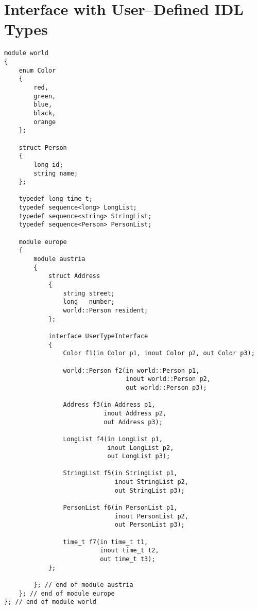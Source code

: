 \section{Interface with User--Defined IDL Types}

\begin{small}
\begin{verbatim}
module world 
{
    enum Color 
    {
        red, 
        green, 
        blue, 
        black, 
        orange
    };
  
    struct Person 
    {
        long id;
        string name;
    };
  
    typedef long time_t;
    typedef sequence<long> LongList;
    typedef sequence<string> StringList;
    typedef sequence<Person> PersonList;

    module europe 
    {
        module austria 
        {
            struct Address 
            {
                string street;
                long   number;
                world::Person resident;
            };
            
            interface UserTypeInterface 
            {
                Color f1(in Color p1, inout Color p2, out Color p3);

                world::Person f2(in world::Person p1, 
                                 inout world::Person p2, 
                                 out world::Person p3);

                Address f3(in Address p1, 
                           inout Address p2, 
                           out Address p3);

                LongList f4(in LongList p1, 
                            inout LongList p2, 
                            out LongList p3);

                StringList f5(in StringList p1, 
                              inout StringList p2, 
                              out StringList p3);

                PersonList f6(in PersonList p1, 
                              inout PersonList p2, 
                              out PersonList p3);

                time_t f7(in time_t t1, 
                          inout time_t t2, 
                          out time_t t3);
            };
      
        }; // end of module austria
    }; // end of module europe
}; // end of module world
\end{verbatim}
\end{small}


